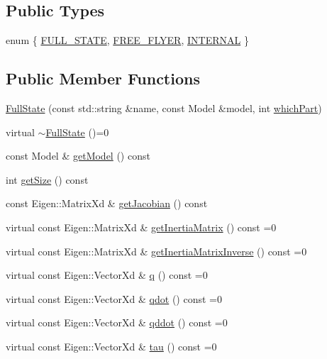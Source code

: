 \subsection*{Public Types}
\begin{DoxyCompactItemize}
\item 
enum \{ \hyperlink{classocra_1_1FullState_a8623fb06b8930505d950f7651e75b519af5d38d391c1a3c23006d51e6db4adea8}{F\+U\+L\+L\+\_\+\+S\+T\+A\+TE}, 
\hyperlink{classocra_1_1FullState_a8623fb06b8930505d950f7651e75b519a2b23349d3727ddf8b0d10a6c06dfcc31}{F\+R\+E\+E\+\_\+\+F\+L\+Y\+ER}, 
\hyperlink{classocra_1_1FullState_a8623fb06b8930505d950f7651e75b519a6c76abe0ec381b256a1e2429308126a5}{I\+N\+T\+E\+R\+N\+AL}
 \}
\end{DoxyCompactItemize}
\subsection*{Public Member Functions}
\begin{DoxyCompactItemize}
\item 
\hyperlink{classocra_1_1FullState_ae30ccfdd99c72531c1218b270d00c5df}{Full\+State} (const std\+::string \&name, const Model \&model, int \hyperlink{classocra_1_1FullState_a75ec7c039df8cb8608ebf34f7b779be5}{which\+Part})
\item 
virtual \hyperlink{classocra_1_1FullState_a7392bab88e107fe2862c01eb9c9bc1a4}{$\sim$\+Full\+State} ()=0
\item 
const Model \& \hyperlink{classocra_1_1FullState_a97f2718a0f72e69c829d67db4514af68}{get\+Model} () const
\item 
int \hyperlink{classocra_1_1FullState_a64f03f9385b36840d23e06de18a40112}{get\+Size} () const
\item 
const Eigen\+::\+Matrix\+Xd \& \hyperlink{classocra_1_1FullState_ada4a4e3af758b4af2ba95516eaad74e1}{get\+Jacobian} () const
\item 
virtual const Eigen\+::\+Matrix\+Xd \& \hyperlink{classocra_1_1FullState_a5d5c2ddfaf4868f78b4621d27b500784}{get\+Inertia\+Matrix} () const =0
\item 
virtual const Eigen\+::\+Matrix\+Xd \& \hyperlink{classocra_1_1FullState_a10f3a888554035bf13b3f636ce4b4edc}{get\+Inertia\+Matrix\+Inverse} () const =0
\item 
virtual const Eigen\+::\+Vector\+Xd \& \hyperlink{classocra_1_1FullState_a3bb03b513d7cb3a5447d1d4eb2d643b0}{q} () const =0
\item 
virtual const Eigen\+::\+Vector\+Xd \& \hyperlink{classocra_1_1FullState_a7018fe03dc3c8b3ec95d3c2015ae60e6}{qdot} () const =0
\item 
virtual const Eigen\+::\+Vector\+Xd \& \hyperlink{classocra_1_1FullState_a5882a53273cd9d3baae36b5850deadae}{qddot} () const =0
\item 
virtual const Eigen\+::\+Vector\+Xd \& \hyperlink{classocra_1_1FullState_a24723b4a382c2bf51e6c32cbd1bd7b06}{tau} () const =0
\end{DoxyCompactItemize}
